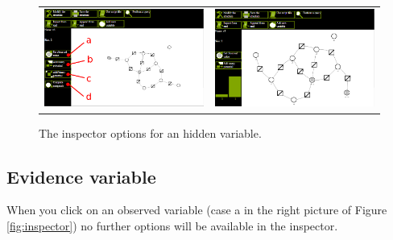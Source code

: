 \begin{figure}
	\centering
\begin{tabular}{ll}
\begin{minipage}[t]{0.49\textwidth}
	\includegraphics[width= \columnwidth]{../src/Chapter_additional/04_EFG_GUI/image/img_11.png}
\end{minipage}
 &
\begin{minipage}[t]{0.49\textwidth}
	\includegraphics[width= \columnwidth]{../src/Chapter_additional/04_EFG_GUI/image/img_12.png}
\end{minipage}
\end{tabular}
	\caption{The inspector options for an hidden variable.}
	\label{fig:hidden}
\end{figure}

\subsection{Evidence variable}

When you click on an observed variable (case a in the right picture of Figure \ref{fig:inspector}) no further options will be available in the inspector.
